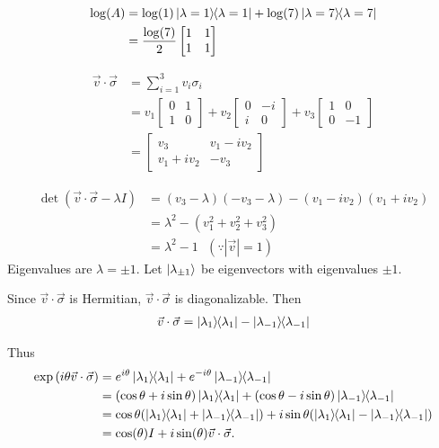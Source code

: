  \begin{align*}
 	\log (A) &=  \log (1) \ket{\lambda = 1}\hspace{-1mm} \bra{\lambda = 1} + \log (7) \ket{\lambda = 7}\hspace{-1mm} \bra{\lambda = 7}\\
 		&= \frac{\log (7)}{2} \begin{bmatrix}
	 		1 & 1 \\
	 		1 & 1
 		\end{bmatrix}
 \end{align*}



\begin{align*}
	\vec{v} \cdot \vec{\sigma} &= \sum_{i=1}^3 v_i \sigma_i\\
		&= v_1 \begin{bmatrix}
		0 & 1 \\
		1 & 0
		\end{bmatrix}
		+ v_2 \begin{bmatrix}
		0 & -i \\
		i & 0
		\end{bmatrix}
		+ v_3 \begin{bmatrix}
		1 & 0 \\
		0 & -1
		\end{bmatrix} \\
		&= \begin{bmatrix}
		v_3 & v_1 - i v_2 \\
		v_1 + iv_2 & -v_3
		\end{bmatrix}
\end{align*}

\begin{align*}
	\det (\vec{v} \cdot \vec{\sigma}  - \lambda I) &= (v_3 - \lambda) (-v_3 - \lambda) - (v_1 - iv_2) (v_1 + iv_2)\\
			&= \lambda^2 - (v_1^2 + v_2^2  + v_3^2)\\
			&= \lambda^2 - 1 ~~~ (\because |\vec{v}| = 1)
\end{align*}
Eigenvalues are $\lambda = \pm 1$.
Let $\ket{\lambda_{ \pm 1 } }$ be eigenvectors with eigenvalues $\pm  1$.

Since $\vec{v} \cdot \vec{\sigma}$ is Hermitian,  $\vec{v} \cdot \vec{\sigma}$ is diagonalizable.
Then
\begin{align*}
	\vec{v} \cdot \vec{\sigma} = \ket{\lambda_1}\hspace{-1mm} \bra{\lambda_1} - \ket{\lambda_{-1}}\hspace{-1mm} \bra{\lambda_{-1}}
\end{align*}

Thus
\begin{align*}
	\exp \left(i \theta \vec{v} \cdot \vec{\sigma} \right) &=
	e^{i \theta} \kb{\lambda_1}  + e^{-i \theta} \kb{\lambda_{-1}}\\
	&= (\cos \theta + i \sin \theta) \kb{\lambda_1} + (\cos \theta - i \sin \theta) \kb{\lambda_{-1}}\\
	&= \cos \theta (\kb{\lambda_1} + \kb{\lambda_{-1}}) + i \sin \theta (\kb{\lambda_1} - \kb{\lambda_{-1}}) \\
	&= \cos( \theta) I + i \sin (\theta) \vec{v} \cdot \vec{\sigma}.
\end{align*}

